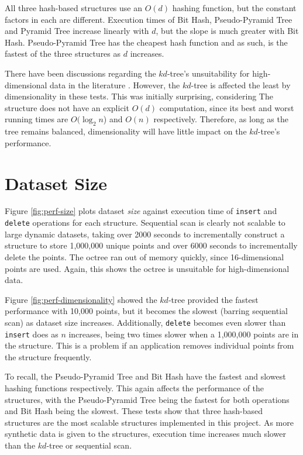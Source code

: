 All three hash-based structures use an $O(d)$ hashing function, but the constant factors in each are different. Execution times of Bit Hash, Pseudo-Pyramid Tree and Pyramid Tree increase linearly with $d$, but the slope is much greater with Bit Hash. Pseudo-Pyramid Tree has the cheapest hash function and as such, is the fastest of the three structures as $d$ increases.

There have been discussions regarding the $kd$-tree's unsuitability for high-dimensional data in the literature \cite{TODO, TODO}. However, the $kd$-tree is affected the least by dimensionality in these tests. This was initially surprising, considering  The structure does not have an explicit $O(d)$ computation, since its best and worst running times are $O(\log_2 n$) and $O(n)$ respectively. Therefore, as long as the tree remains balanced, dimensionality will have little impact on the $kd$-tree's performance.

\section{Dataset Size}

Figure \ref{fig:perf-size} plots dataset \textit{size} against execution time of \texttt{insert} and \texttt{delete} operations for each structure. Sequential scan is clearly not scalable to large dynamic datasets, taking over 2000 seconds to incrementally construct a structure to store 1,000,000 unique points and over 6000 seconds to incrementally delete the points. The octree ran out of memory quickly, since 16-dimensional points are used. Again, this shows the octree is unsuitable for high-dimensional data.

Figure \ref{fig:perf-dimensionality} showed the $kd$-tree provided the fastest performance with 10,000 points, but it becomes the slowest (barring sequential scan) as dataset size increases. Additionally, \texttt{delete} becomes even slower than \texttt{insert} does as $n$ increases, being two times slower when a 1,000,000 points are in the structure. This is a problem if an application removes individual points from the structure frequently.

To recall, the Pseudo-Pyramid Tree and Bit Hash have the fastest and slowest hashing functions respectively. This again affects the performance of the structures, with the Pseudo-Pyramid Tree being the fastest for both operations and Bit Hash being the slowest. These tests show that three hash-based structures are the most scalable structures implemented in this project. As more synthetic data is given to the structures, execution time increases much slower than the $kd$-tree or sequential scan.

